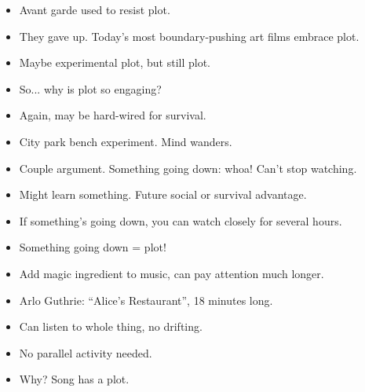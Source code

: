 \documentclass[12pt]{article}
\begin{document}
{
\begin{itemize}

\item Avant garde used to resist plot.

\item They gave up.  Today's most boundary-pushing art films embrace plot.

\item Maybe experimental plot, but still plot.

\item So... why is plot so engaging?

\item Again, may be hard-wired for survival.
\end{itemize}

\begin{itemize}

\item City park bench experiment.  Mind wanders.

\item Couple argument.  Something going down:  whoa!  Can't stop watching.

\item Might learn something.  Future social or survival advantage.

\item If something's going down, you can watch closely for several hours.

\item Something going down = plot!
\end{itemize}

\begin{itemize}

\item Add magic ingredient to music, can pay attention much longer.

\item Arlo Guthrie:  ``Alice's Restaurant'', 18 minutes long.

\item Can listen to whole thing, no drifting.

\item No parallel activity needed.

\item Why?  Song has a plot.
\end{itemize}

\begin{itemize}


\end{itemize}}
\end{document}

